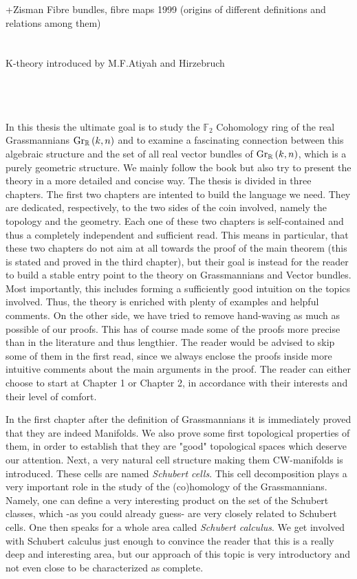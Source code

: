 +Zisman Fibre bundles, fibre maps 1999 (origins of different definitions and relations among them)
\ \\
\ \\
\ \\
K-theory introduced by M.F.Atiyah and Hirzebruch

\ \\
\ \\
\ \\




In this thesis the  ultimate goal is to study the $\mathbb{F}_2$ Cohomology ring of the real Grassmannians $\Gr{k}{n}{\mathbb{R}}$ and to examine a fascinating connection between this algebraic structure and the set of all real vector bundles of $\Gr{k}{n}{\mathbb{R}}$, which is a purely geometric structure. We mainly follow the book \cite{char_class} but also try to present the theory in a more detailed and concise way. The thesis is divided in three chapters.
The first two chapters are intented to build the language we need. They are dedicated, respectively, to the two sides of the coin involved, namely the topology and the geometry. Each one of these two chapters is self-contained and thus a completely independent and sufficient read. This means in particular, that these two chapters do not aim at all towards the proof of the main theorem (this is stated and proved in the third chapter), but their goal is instead for the reader to build a stable entry point to the theory on Grassmannians and Vector bundles. Most importantly, this includes forming a sufficiently good intuition on the topics involved. Thus, the theory is enriched with plenty of examples and helpful comments. On the other side, we have tried to remove hand-waving as much as possible of our proofs. This has of course made some of the proofs more precise than in the literature and thus lengthier. The reader would be advised to skip some of them in the first read, since we always enclose the proofs inside more intuitive comments about the main arguments in the proof.
The reader can either choose to start at Chapter 1 or Chapter 2, in accordance with their interests and their level of comfort.

In the first chapter after the definition of Grassmannians it is immediately proved that they are indeed Manifolds. We also prove some first topological properties of them, in order to establish that they are "good" topological spaces which deserve our attention. Next, a very natural cell structure making them CW-manifolds is introduced. These cells are named \emph{Schubert cells}. This cell decomposition plays a very important role in the study of the (co)homology of the Grassmannians. Namely, one can define a very interesting product on the set of the Schubert classes, which -as you could already guess- are very closely related to Schubert cells. One then speaks for a whole area called \emph{Schubert calculus}. We get involved with Schubert calculus just enough to convince the reader that this is a really deep and interesting area, but our approach of this topic is very introductory and not even close to be characterized as complete.

